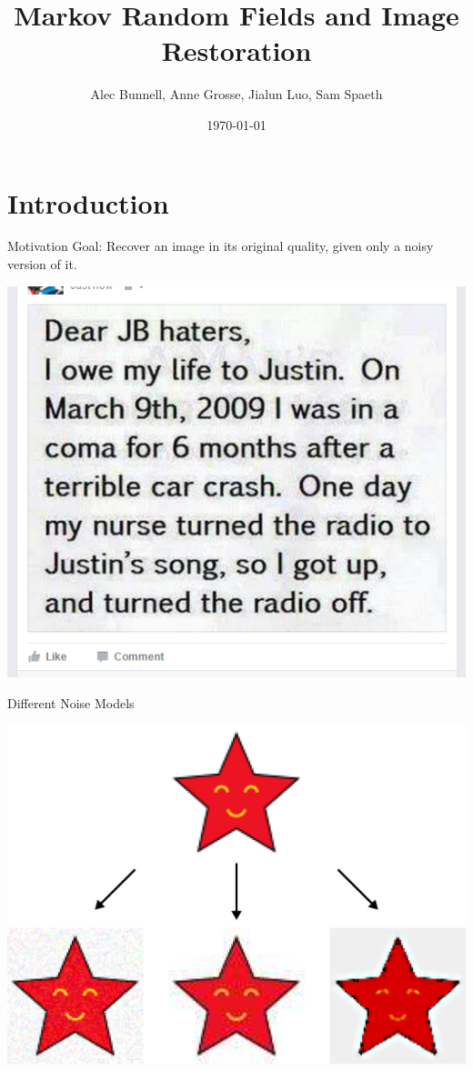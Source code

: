 \documentclass[10pt]{beamer}
\title{Markov Random Fields and Image Restoration}
\date{\today}
\author{Alec Bunnell, Anne Grosse, Jialun Luo, Sam Spaeth}
\institute{Carleton College\\ Northfield, MN}
\begin{document}
\begin{frame}
\titlepage
\end{frame}

\section{Introduction}

\begin{frame}{Motivation}
Goal: Recover an image in its original quality, given only a noisy version of it.
\pause
\begin{center}
\includegraphics[scale=0.4]{img/bieber}
\end{center}
\end{frame}

\begin{frame}{Different Noise Models}
\begin{center}
\includegraphics[scale=0.3]{img/allstars}
\end{center}
\end{frame}
\end{document}
